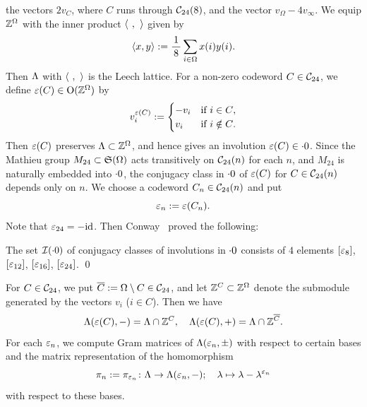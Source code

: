 \documentclass{amsart} %
\begin{document}
the vectors $2v_C$,
where $C$ runs through $\mathord{\mathcal{C}}_{24}(8)$, and 
the vector $v_{\Omega}-4v_{\infty}$.
%
%
We equip $\mathord{\mathbb{Z}}^{\Omega}$ with the inner product $\langle \phantom{i}, \phantom{i} \rangle$ 
given by
\[
\langle x, y \rangle:=\frac{1}{\,8\,} \sum_{i\in\Omega} x(i) y(i).
\]
Then $\Lambda$ with $\langle \phantom{i}, \phantom{i} \rangle$ is the Leech lattice.
For a non-zero codeword $C\in \mathord{\mathcal{C}}_{24}$,
we define $\varepsilon(C)\in \mathord{\mathrm{O}}(\mathord{\mathbb{Z}}^{\Omega})$ by 
\[
v_i^{\varepsilon(C)}:=
\begin{cases}
-v_i & \textrm{if $i\in C$}, \\
v_i& \textrm{if $i\notin C$}.
\end{cases}
\]
Then $\varepsilon(C)$ 
preserves %
$\Lambda\subset \mathord{\mathbb{Z}}^{\Omega}$, and hence gives 
an involution $\varepsilon(C)\in \cdot 0$. 
Since the Mathieu group $M_{24}\subset \mathord{\mathfrak{S}}(\Omega)$ acts transitively
on $\mathord{\mathcal{C}}_{24}(n)$ for each $n$, 
and $M_{24}$ is naturally embedded into $\cdot 0$,
the conjugacy class in $\cdot 0$ of $\varepsilon(C)$ for $C\in \mathord{\mathcal{C}}_{24}(n)$ 
depends only on $n$.
We choose a codeword $C_n\in \mathord{\mathcal{C}}_{24}(n)$ and put
\[
\varepsilon_n:=\varepsilon(C_n).
\]
Note that $\varepsilon_{24}=-\mathord{\mathrm{id}}$.
Then Conway~\cite[Chapter 10, Section 3.7]{theCSbook} proved the following:
%
\begin{theorem}[Conway]
The set $\mathord{\mathcal{I}}(\cdot 0)$ of conjugacy classes of involutions in $\cdot 0$ 
consists of $4$ elements $[\varepsilon_8]$, $[\varepsilon_{12}]$, $[\varepsilon_{16}]$, $[\varepsilon_{24}]$.
\qed
\end{theorem}
%
%
%
For  $C\in \mathord{\mathcal{C}}_{24}$,
we put $\overline{C}:=\Omega\setminus C\in \mathord{\mathcal{C}}_{24}$, 
and let 
$\mathord{\mathbb{Z}}^{C}\subset \mathord{\mathbb{Z}}^{\Omega}$ denote 
the submodule generated by the vectors $v_i$ ($i\in C$).
Then we have
%
\begin{equation}\label{eq:Leechveppm}
\Lambda(\varepsilon(C), -)=\Lambda\cap \mathord{\mathbb{Z}}^{C},
\quad
\Lambda(\varepsilon(C), +)=\Lambda\cap \mathord{\mathbb{Z}}^{\overline{C}}.
\end{equation}
%
For each $\varepsilon_n$,
we compute Gram matrices of $\Lambda(\varepsilon_n, \pm)$ 
with respect to certain bases
and the matrix representation of the homomorphism 
\[
\pi_n:=\pi_{\varepsilon_n}\colon \Lambda \to \Lambda(\varepsilon_n, -); \quad \lambda\mapsto \lambda-\lambda^{\varepsilon_n}
\]
with respect to these bases.
\end{document}

